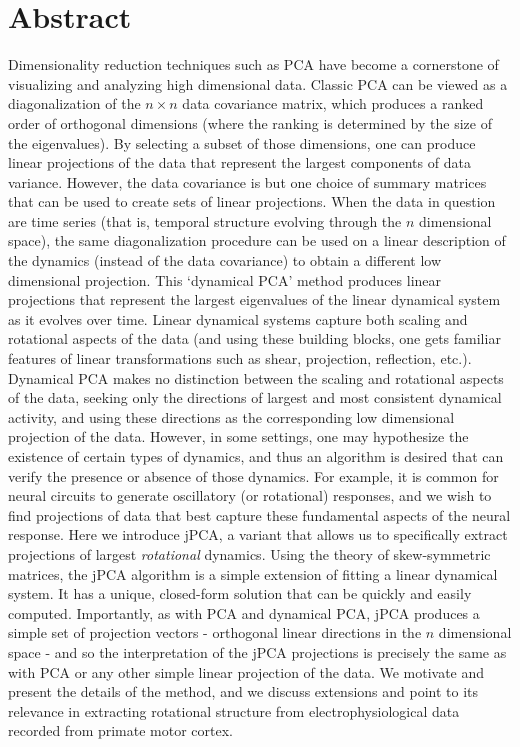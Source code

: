 \documentclass[11pt]{article}%
\begin{document}


\section*{Abstract}
%
Dimensionality reduction techniques such as PCA have become a cornerstone of visualizing and analyzing high dimensional data.   Classic PCA can be viewed as a diagonalization of the $n \times n$ data covariance matrix, which produces a ranked order of orthogonal dimensions (where the ranking is determined by the size of the eigenvalues).   By selecting a subset of those dimensions, one can produce linear projections of the data that represent the largest components of data variance.  However, the data covariance is but one choice of summary matrices that can be used to create sets of linear projections.   When the data in question are time series (that is, temporal structure evolving through the $n$ dimensional space), the same diagonalization procedure can be used on a linear description of the dynamics (instead of the data covariance) to obtain a different low dimensional projection.  This `dynamical PCA' method produces linear projections that represent the largest eigenvalues of the linear dynamical system as it evolves over time.  Linear dynamical systems capture both scaling and rotational aspects of the data (and using these building blocks, one gets familiar features of linear transformations such as shear, projection, reflection, etc.).  Dynamical PCA makes no distinction between the scaling and rotational aspects of the data, seeking only the directions of largest and most consistent dynamical activity, and using these directions as the corresponding low dimensional projection of the data.  However, in some settings, one may hypothesize the existence of certain types of dynamics, and thus an algorithm is desired that can verify the presence or absence of those dynamics.  For example, it is common for neural circuits to generate oscillatory (or rotational) responses, and we wish to find projections of data that best capture these fundamental aspects of the neural response.  Here we introduce jPCA, a variant that allows us to specifically extract projections of largest \emph{rotational} dynamics.   Using the theory of skew-symmetric matrices, the jPCA algorithm is a simple extension of fitting a linear dynamical system.  It has a unique, closed-form solution that can be quickly and easily computed.  Importantly, as with PCA and dynamical PCA, jPCA produces a simple set of projection vectors - orthogonal linear directions in the $n$ dimensional space - and so the interpretation of the jPCA projections is precisely the same as with PCA or any other simple linear projection of the data.  We motivate and present the details of the method, and we discuss extensions and point to its relevance in extracting rotational structure from electrophysiological data recorded from primate motor cortex.
%
%
\end{document}

